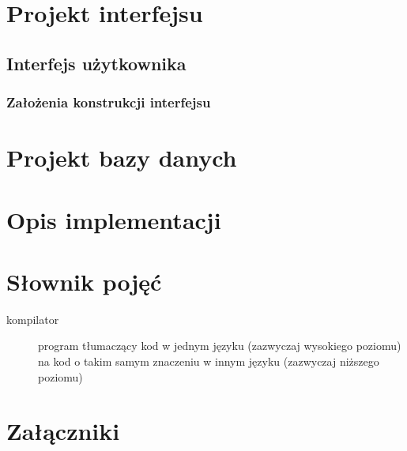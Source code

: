\section{Projekt interfejsu}

\subsection{Interfejs użytkownika}


\subsubsection{Założenia konstrukcji interfejsu}




\section{Projekt bazy danych}



\section{Opis implementacji}


\section{Słownik pojęć}

\begin{description}
    \item[kompilator] program tłumaczący kod w jednym języku (zazwyczaj wysokiego poziomu) na kod o takim
        samym znaczeniu w innym języku (zazwyczaj niższego poziomu)
   
\end{description}

\section{Załączniki}
